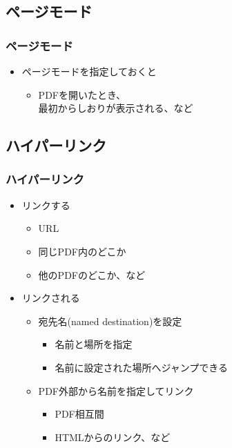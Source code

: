 \documentclass[unicode,17pt]{beamer}
\begin{document}
\subsection{ページモード}
\begin{frame}\frametitle{ページモード}
  \begin{itemize}
  \item ページモードを指定しておくと
    \begin{itemize}
    \item PDFを開いたとき、\\
      最初からしおりが表示される、など
    \end{itemize}
  \end{itemize}
\end{frame}

\subsection{ハイパーリンク}
\begin{frame}\frametitle{ハイパーリンク}
  \begin{itemize}
  \item リンクする
    \begin{itemize}
    \item URL
    \item 同じPDF内のどこか
    \item 他のPDFのどこか、など
    \end{itemize}
  \item リンクされる
    \begin{itemize}
    \item 宛先名(named destination)を設定
      \begin{itemize}
      \item 名前と場所を指定
      \item 名前に設定された場所へジャンプできる
      \end{itemize}
    \item PDF外部から名前を指定してリンク
      \begin{itemize}
      \item PDF相互間
      \item HTMLからのリンク、など
      \end{itemize}
    \end{itemize}
  \end{itemize}
\end{frame}
\end{document}
